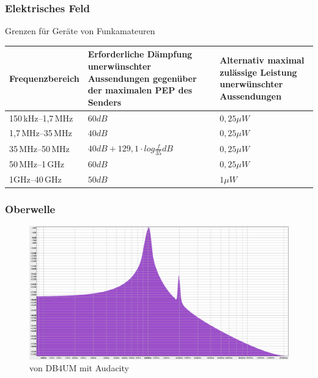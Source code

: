 \begin{frame}
  \frametitle{Elektrisches Feld}
  \begin{center}
    \begin{block}{Grenzen für Geräte von Funkamateuren}
      \begin{tabular}{p{}|p{}|p{}}
        Frequenzbereich & Erforderliche Dämpfung unerwünschter Aussendungen gegenüber der maximalen PEP des Senders & Alternativ maximal zulässige Leistung unerwünschter Aussendungen \\ \hline \hline
        150\,kHz--1,7\,MHz & $60dB$ & $0,25 \mu W$ \\ \hline
        1,7\,MHz--35\,MHz & $40dB$ & $0,25 \mu W$ \\ \hline
        35\,MHz--50\,MHz & $40dB + 129,1 \cdot log \frac{f}{35}dB $ & $0,25 \mu W$ \\ \hline
        50\,MHz--1\,GHz & $60dB$ & $0,25 \mu W$ \\ \hline
        1GHz--40\,GHz & $50dB$ & $1 \mu W$
      \end{tabular}
    \end{block}
  \end{center}
\end{frame}

\begin{frame}
  \frametitle{Oberwelle}
  \begin{center}
    \begin{figure}
      \includegraphics[width=1\textwidth,height=.75\textheight,keepaspectratio]{a19/oberwelle.png}
      \caption{von DB4UM mit Audacity}
    \end{figure}
  \end{center}
\end{frame}

